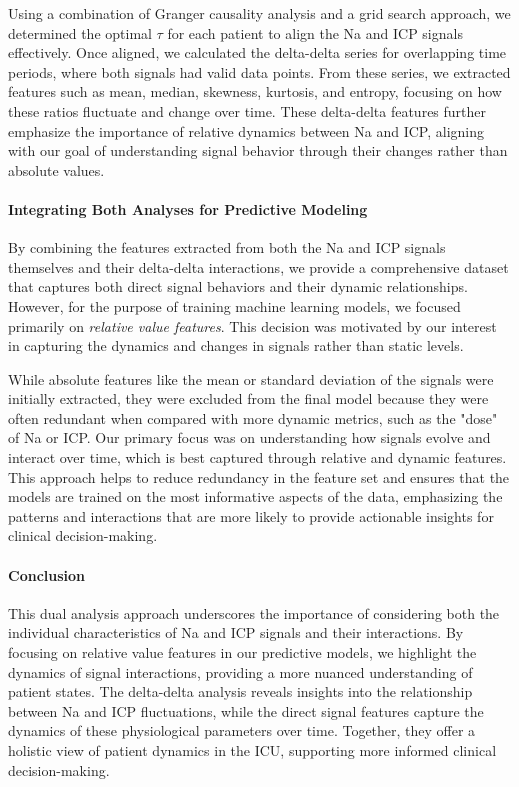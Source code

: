 Using a combination of Granger causality analysis and a grid search approach, we determined the optimal $\tau$ for each patient to align the Na and ICP signals effectively. Once aligned, we calculated the delta-delta series for overlapping time periods, where both signals had valid data points. From these series, we extracted features such as mean, median, skewness, kurtosis, and entropy, focusing on how these ratios fluctuate and change over time. These delta-delta features further emphasize the importance of relative dynamics between Na and ICP, aligning with our goal of understanding signal behavior through their changes rather than absolute values.

\paragraph{Integrating Both Analyses for Predictive Modeling}

By combining the features extracted from both the Na and ICP signals themselves and their delta-delta interactions, we provide a comprehensive dataset that captures both direct signal behaviors and their dynamic relationships. However, for the purpose of training machine learning models, we focused primarily on \textit{relative value features}. This decision was motivated by our interest in capturing the dynamics and changes in signals rather than static levels.

While absolute features like the mean or standard deviation of the signals were initially extracted, they were excluded from the final model because they were often redundant when compared with more dynamic metrics, such as the "dose" of Na or ICP. Our primary focus was on understanding how signals evolve and interact over time, which is best captured through relative and dynamic features. This approach helps to reduce redundancy in the feature set and ensures that the models are trained on the most informative aspects of the data, emphasizing the patterns and interactions that are more likely to provide actionable insights for clinical decision-making.

\paragraph{Conclusion}

This dual analysis approach underscores the importance of considering both the individual characteristics of Na and ICP signals and their interactions. By focusing on relative value features in our predictive models, we highlight the dynamics of signal interactions, providing a more nuanced understanding of patient states. The delta-delta analysis reveals insights into the relationship between Na and ICP fluctuations, while the direct signal features capture the dynamics of these physiological parameters over time. Together, they offer a holistic view of patient dynamics in the ICU, supporting more informed clinical decision-making.


